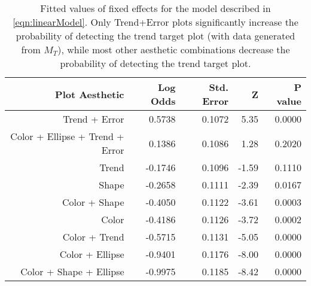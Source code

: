 \begin{table}[ht]
\centering
\begin{tabular}{rrrrr}
  \hline
Plot Aesthetic & Log Odds & Std. Error & Z & P value \\ 
  \hline
Trend + Error & 0.5738 & 0.1072 & 5.35 & 0.0000 \\ 
  Color + Ellipse + Trend + Error & 0.1386 & 0.1086 & 1.28 & 0.2020 \\ 
  Trend & -0.1746 & 0.1096 & -1.59 & 0.1110 \\ 
  Shape & -0.2658 & 0.1111 & -2.39 & 0.0167 \\ 
  Color + Shape & -0.4050 & 0.1122 & -3.61 & 0.0003 \\ 
  Color & -0.4186 & 0.1126 & -3.72 & 0.0002 \\ 
  Color + Trend & -0.5715 & 0.1131 & -5.05 & 0.0000 \\ 
  Color + Ellipse & -0.9401 & 0.1176 & -8.00 & 0.0000 \\ 
  Color + Shape + Ellipse & -0.9975 & 0.1185 & -8.42 & 0.0000 \\ 
   \hline
\end{tabular}
\caption[Fixed effects for trend target logistic model]{Fitted values of fixed effects for the model described in \eqref{eqn:linearModel}. Only Trend+Error plots significantly increase the probability of detecting the trend target plot (with data generated from $M_T$), while most other aesthetic combinations decrease the probability of detecting the trend target plot.} 
\label{tab:line.fixef}
\end{table}
